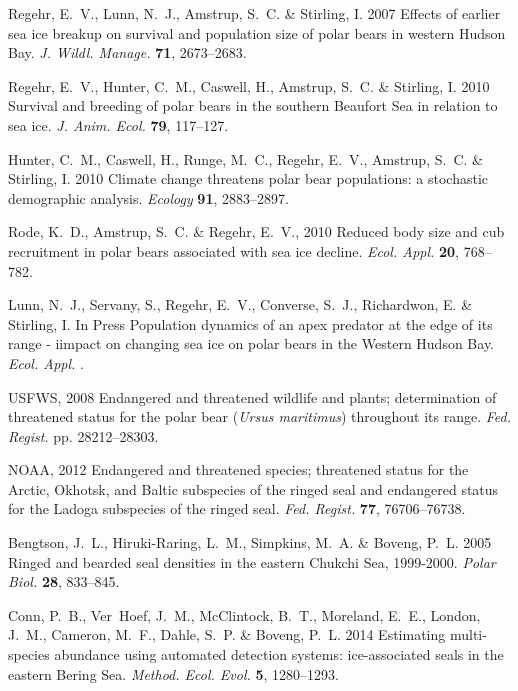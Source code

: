 \documentclass[]{rsos}%
\begin{document}
\begin{thebibliography}{10}
Regehr, E.~V., Lunn, N.~J., Amstrup, S.~C. \& Stirling, I. 2007 Effects of
  earlier sea ice breakup on survival and population size of polar bears in
  western {H}udson {B}ay.
 \emph{J. Wildl. Manage.} \textbf{71}, 2673--2683.

Regehr, E.~V., Hunter, C.~M., Caswell, H., Amstrup, S.~C. \& Stirling, I. 2010
  Survival and breeding of polar bears in the southern {B}eaufort {S}ea in
  relation to sea ice.
 \emph{J. Anim. Ecol.} \textbf{79}, 117--127.

Hunter, C.~M., Caswell, H., Runge, M.~C., Regehr, E.~V., Amstrup, S.~C. \&
  Stirling, I. 2010 Climate change threatens polar bear populations: a
  stochastic demographic analysis.
 \emph{Ecology} \textbf{91}, 2883--2897.

Rode, K.~D., Amstrup, S.~C. \& Regehr, E.~V., 2010 Reduced body size and cub
  recruitment in polar bears associated with sea ice decline.
 \emph{Ecol. Appl.} \textbf{20}, 768--782.

Lunn, N.~J., Servany, S., Regehr, E.~V., Converse, S.~J., Richardwon, E. \&
  Stirling, I. In Press Population dynamics of an apex predator at the edge of
  its range - iimpact on changing sea ice on polar bears in the {W}estern
  {H}udson {B}ay.
 \emph{Ecol. Appl.} .

USFWS, 2008 Endangered and threatened wildlife and plants; determination of
  threatened status for the polar bear (\textit{{U}rsus maritimus}) throughout
  its range.
 \emph{Fed. Regist.} pp. 28212--28303.

NOAA, 2012 Endangered and threatened species; threatened status for the
  {A}rctic, {O}khotsk, and {B}altic subspecies of the ringed seal and
  endangered status for the {L}adoga subspecies of the ringed seal.
 \emph{Fed. Regist.} \textbf{77}, 76706--76738.

Bengtson, J.~L., Hiruki-Raring, L.~M., Simpkins, M.~A. \& Boveng, P.~L. 2005
  Ringed and bearded seal densities in the eastern {C}hukchi {S}ea, 1999-2000.
 \emph{Polar Biol.} \textbf{28}, 833--845.

Conn, P.~B., Ver~Hoef, J.~M., McClintock, B.~T., Moreland, E.~E., London,
  J.~M., Cameron, M.~F., Dahle, S.~P. \& Boveng, P.~L. 2014 Estimating
  multi-species abundance using automated detection systems: ice-associated
  seals in the eastern {B}ering {S}ea.
 \emph{Method. Ecol. Evol.} \textbf{5}, 1280--1293.


\end{thebibliography}
\end{document}
